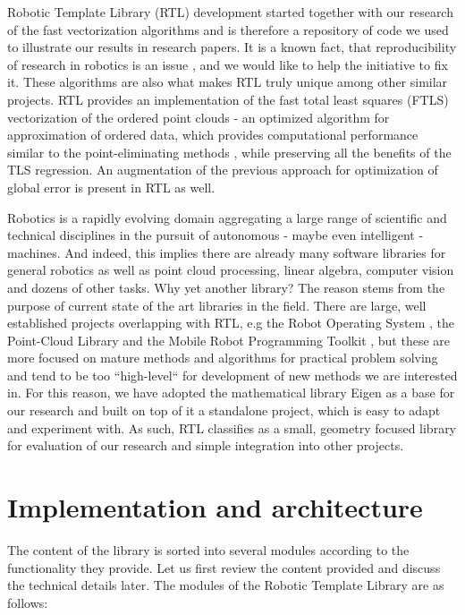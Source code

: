 \documentclass[
    letterpaper, 
    10 pt, 
    conference,
    table,
]{ieeeconf}
\begin{document}
Robotic Template Library (RTL) development started together with our research of the fast vectorization algorithms and is therefore a repository of code we used to illustrate our results in research papers. It is a known fact, that reproducibility of research in robotics is an issue \cite{Bonsignorio2017}, \cite{roboticscience2019} and we would like to help the initiative to fix it. These algorithms are also what makes RTL truly unique among other similar projects. RTL provides an implementation of the fast total least squares (FTLS) vectorization \cite{Jelinek2016} of the ordered point clouds - an optimized algorithm for approximation of ordered data, which provides computational performance similar to the point-eliminating methods \cite{Shi2006}, while preserving all the benefits of the TLS regression. An augmentation of the previous approach \cite{Jelinek2016a} for optimization of global error is present in RTL as well. 

Robotics is a rapidly evolving domain aggregating a large range of scientific and technical disciplines in the pursuit of autonomous - maybe even intelligent - machines. And indeed, this implies there are already many software libraries for general robotics as well as point cloud processing, linear algebra, computer vision and dozens of other tasks. Why yet another library? The reason stems from the purpose of current state of the art libraries in the field. There are large, well established projects overlapping with RTL, e.g the Robot Operating System \cite{ros}, the Point-Cloud Library \cite{pcl} and the Mobile Robot Programming Toolkit \cite{Claraco2020}, but these are more focused on mature methods and algorithms for practical problem solving and tend to be too ``high-level`` for development of new methods we are interested in. For this reason, we have adopted the mathematical library Eigen \cite{eigen} as a base for our research and built on top of it a standalone project, which is easy to adapt and experiment with. As such, RTL classifies as a small, geometry focused library for  evaluation of our research and simple integration into other projects. 

\section*{Implementation and architecture}
The content of the library is sorted into several modules according to the functionality they provide. Let us first review the content provided and discuss the technical details later. The modules of the Robotic Template Library are as follows:
\end{document}

